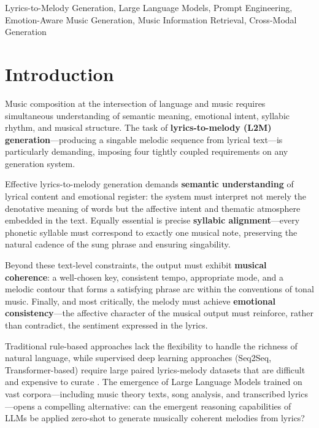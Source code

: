 \documentclass[conference]{IEEEtran}
\begin{document}
\begin{IEEEkeywords}
Lyrics-to-Melody Generation, Large Language Models, Prompt Engineering,
Emotion-Aware Music Generation, Music Information Retrieval, Cross-Modal
Generation
\end{IEEEkeywords}

\section{Introduction}

Music composition at the intersection of language and music requires
simultaneous understanding of semantic meaning, emotional intent, syllabic
rhythm, and musical structure. The task of \textbf{lyrics-to-melody (L2M)
generation}---producing a singable melodic sequence from lyrical
text---is particularly demanding, imposing four tightly coupled requirements
on any generation system.

Effective lyrics-to-melody generation demands \textbf{semantic understanding}
of lyrical content and emotional register: the system must interpret not merely
the denotative meaning of words but the affective intent and thematic
atmosphere embedded in the text. Equally essential is precise \textbf{syllabic
alignment}---every phonetic syllable must correspond to exactly one musical
note, preserving the natural cadence of the sung phrase and ensuring
singability.

Beyond these text-level constraints, the output must exhibit \textbf{musical
coherence}: a well-chosen key, consistent tempo, appropriate mode, and a
melodic contour that forms a satisfying phrase arc within the conventions of
tonal music. Finally, and most critically, the melody must achieve
\textbf{emotional consistency}---the affective character of the musical output
must reinforce, rather than contradict, the sentiment expressed in the lyrics.

Traditional rule-based approaches lack the flexibility to handle the richness
of natural language, while supervised deep learning approaches (Seq2Seq,
Transformer-based) require large paired lyrics-melody datasets that are
difficult and expensive to curate \cite{briot2020}. The emergence of Large
Language Models trained on vast corpora---including music theory texts, song
analysis, and transcribed lyrics---opens a compelling alternative: can the
emergent reasoning capabilities of LLMs be applied zero-shot to generate
musically coherent melodies from lyrics?
\end{document}
